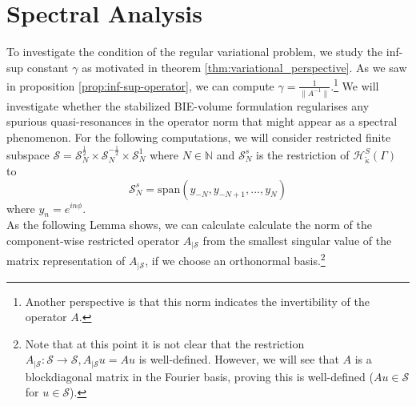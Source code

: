 \documentclass[12pt,journal,compsoc, onecolumn]{IEEEtran}
\begin{document}
\section{Spectral Analysis}
\label{section:spectral_discretisation}
To investigate the condition of the regular variational problem, we study the inf-sup constant $\gamma$ as motivated in theorem \ref{thm:variational_perspective}. As we saw in proposition \ref{prop:inf-sup-operator}, we can compute $\gamma = \frac{1}{\|A^{-1}\|}$.\footnote{Another perspective is that this norm indicates the invertibility of the operator $A$.} We will investigate whether the stabilized BIE-volume formulation regularises any spurious quasi-resonances in the operator norm that might appear as a spectral phenomenon. 
For the following computations, we will consider restricted finite subspace $\mathcal{S} = \mathcal{S}_N^{\frac{1}{2}} 
\times \mathcal{S}_N^{-\frac{1}{2}} \times \mathcal{S}_N^{1}$ where $N \in \mathbb{N}$ 
and $\mathcal{S}_N^s$ is the restriction of $\mathcal{H}_{\tilde\kappa}^S(\Gamma)$ to $$\mathcal{S}_N^s = \mathrm{span}(y_{-N}, y_{-N+1}, ..., y_N)$$ where $y_n = e^{in\phi}$.\\
As the following Lemma shows, we can calculate calculate the norm of the component-wise restricted operator $A_{|\mathcal{S}}$ from the smallest singular value of the matrix representation of $A_{|\mathcal{S}}$, if we choose an orthonormal basis.\footnote{Note that at this point it is not clear that the restriction $A_{|\mathcal{S}}: \mathcal{S} \rightarrow \mathcal{S}, A_{|\mathcal{S}}u = Au$ is  well-defined. However, we will see that $A$ is a blockdiagonal matrix in the Fourier basis, proving this is well-defined ($Au \in \mathcal{S}$ for $u \in \mathcal{S}$).}
\end{document}
